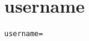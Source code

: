 \section{username}
\label{configuration:Username}
\ClearAPI
\TODO
\begin{lstlisting}[style=Props,caption={Usage example for \textit{username}}]
username=
\end{lstlisting}